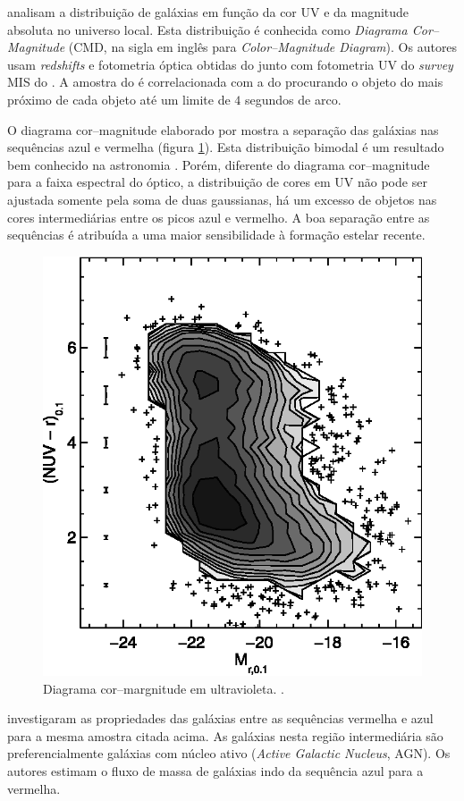 \citet{Wyder2007} analisam a distribuição de galáxias em função da cor UV e da
magnitude absoluta no universo local. Esta distribuição é conhecida como {\em
Diagrama Cor--Magnitude} (CMD, na sigla em inglês para {\em Color--Magnitude
Diagram}). Os autores usam {\em redshifts} e fotometria óptica obtidas do \SDSS
junto com fotometria UV do {\em survey} MIS do \galex. A amostra do \SDSS é
correlacionada com a do \galex procurando o objeto do \galex mais próximo de
cada objeto \SDSS até um limite de $4$ segundos de arco.

O diagrama cor--magnitude elaborado por \citeauthor{Wyder2007} mostra a
separação das galáxias nas sequências azul e vermelha (figura
\ref{fig:WyderCMD}). Esta distribuição bimodal é um resultado bem conhecido na
astronomia \citep{Baldry2004}. Porém, diferente do diagrama cor--magnitude para
a faixa espectral do óptico, a distribuição de cores em UV não pode ser ajustada
somente pela soma de duas gaussianas, há um excesso de objetos nas cores
intermediárias entre os picos azul e vermelho. A boa separação entre as
sequências é atribuída a uma maior sensibilidade à formação estelar recente.

\begin{figure}
	\includegraphics[width=0.7\columnwidth]{figuras/cmd-wyder.eps}
	\caption[Diagrama cor--margnitude em ultravioleta.]
	{Diagrama cor--margnitude em ultravioleta. \citep[figura 7]{Wyder2007}.}
	\label{fig:WyderCMD}
\end{figure}

\citet{Martin2007} investigaram as propriedades das galáxias entre as sequências
vermelha e azul para a mesma amostra citada acima. As galáxias nesta região
intermediária são preferencialmente galáxias com núcleo ativo ({\em Active
Galactic Nucleus}, AGN). Os autores estimam o fluxo de massa de galáxias indo da
sequência azul para a vermelha.

